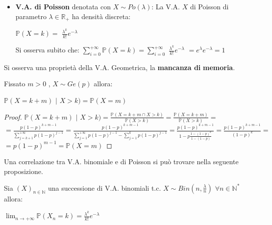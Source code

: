 \begin{itemize}
   \vspace{10px}
   \item \textbf{V.A. di Poisson} denotata con $X\sim Po(\lambda)$: 
   \vspace{5px}
   \newline
   \noindent
   La V.A. $X$ di Poisson di parametro $\lambda\in\mathbb{R}_{+}$ ha densità discreta:
   \begin{center}
       $\mathbb{P}(X=k)=$ {\large$\frac{\lambda^k}{k!}e^{-\lambda}$}
   \end{center}
   Si osserva subito che: $\sum\limits_{i=0}^{+\infty}\mathbb{P}(X=k)=\sum\limits_{i=0}^{+\infty}$ {\large$\frac{\lambda^k}{k!}e^{-\lambda}$} $=e^{\lambda}e^{-\lambda}=1$
\end{itemize}

\vspace{15px}

Si osserva una proprietà della V.A. Geometrica, la \textbf{mancanza di} 
\newline
\textbf{memoria}.

\begin{proposition}
Fissato $m>0$ , $X\sim Ge(p)$ allora: 
\begin{center}
$\mathbb{P}(X=k+m)$ $|$ $X>k)=\mathbb{P}(X=m)$    
\end{center}

\vspace{10px}

\begin{proof}
$\mathbb{P}(X=k+m)$ $|$ $X>k)=${\large$\frac{\mathbb{P}(X=k+m\cap X>k)}{\mathbb{P}(X>k)}=\frac{\mathbb{P}(X=k+m)}{\mathbb{P}(X>k)}=$
\vspace{10px}
\newline
$=\frac{p(1-p)^{k+m-1}}{\sum\limits_{j=k+1}^{+\infty}p(1-p)^{j-1}}=\frac{p(1-p)^{k+m-1}}{\sum\limits_{j=1}^{+\infty}p(1-p)^{j-1}-\sum\limits_{j=1}^{k}p(1-p)^{j-1}}=\frac{p(1-p)^{k+m-1}}{1-p\frac{1-(1-p)^k}{1-(1-p)}}=\frac{p(1-p)^{k+m-1}}{(1-p)^k}=$}
\vspace{10px}
\newline
$=p(1-p)^{m-1}=\mathbb{P}(X=m)$
\end{proof}
\end{proposition}

\vspace{10px}

Una correlazione tra V.A. binomiale e di Poisson si può trovare nella seguente proposizione.

\begin{proposition}
Sia $(X)_{n\in\mathbb{N}}$ una successione di V.A. binomiali t.c. 
\newline
$X\sim Bin(n,\frac{\lambda}{n})$ \hspace{4px} $\forall n\in\mathbb{N}^*$ allora:
\begin{center}
    $\lim_{n\to+\infty}\mathbb{P}(X_n = k)=\frac{\lambda^k}{k!}e^{-\lambda}$
\end{center}
\end{proposition}

